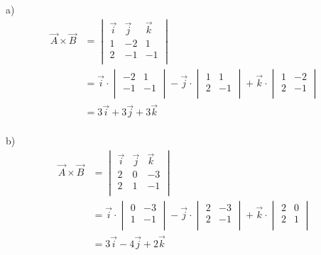 \documentclass{article}
\begin{document}
a)
\begin{equation*}
\begin{split}
  \vec{A} \times \vec{B} 
  &= \begin{vmatrix}
       \vec{i} & \vec{j} & \vec{k} \\
       1 & -2 & 1 \\
       2 & -1 & -1 \\
     \end{vmatrix} \\
  &= \vec{i} \cdot \begin{vmatrix}
                     -2 & 1 \\
                     -1 & -1 \\
                   \end{vmatrix} - 
     \vec{j} \cdot \begin{vmatrix}
                     1 & 1 \\
                     2 & -1 \\    
                   \end{vmatrix} + 
     \vec{k} \cdot \begin{vmatrix}
                     1 & -2 \\
                     2 & -1 \\ 
                   \end{vmatrix} \\
  &= 3\vec{i} + 3\vec{j} + 3\vec{k} \\
\end{split}
\end{equation*}

b)
\begin{equation*}
\begin{split}
  \vec{A} \times \vec{B} 
  &= \begin{vmatrix}
       \vec{i} & \vec{j} & \vec{k} \\
       2 & 0 & -3 \\
       2 & 1 & -1 \\
     \end{vmatrix} \\
  &= \vec{i} \cdot \begin{vmatrix}
                     0 & -3 \\
                     1 & -1 \\
                   \end{vmatrix} - 
     \vec{j} \cdot \begin{vmatrix}
                     2 & -3 \\
                     2 & -1 \\    
                   \end{vmatrix} + 
     \vec{k} \cdot \begin{vmatrix}
                     2 & 0 \\
                     2 & 1 \\ 
                   \end{vmatrix} \\
  &= 3\vec{i} - 4\vec{j} + 2\vec{k} \\
\end{split}
\end{equation*}
\end{document}
